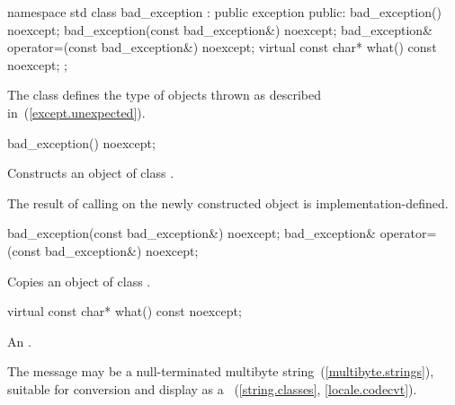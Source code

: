 %
\begin{codeblock}
namespace std {
  class bad_exception : public exception {
  public:
    bad_exception() noexcept;
    bad_exception(const bad_exception&) noexcept;
    bad_exception& operator=(const bad_exception&) noexcept;
    virtual const char* what() const noexcept;
  };
}
\end{codeblock}

\pnum
The class
defines the type of objects thrown as
described in~(\ref{except.unexpected}).

%
\begin{itemdecl}
bad_exception() noexcept;
\end{itemdecl}

\begin{itemdescr}
\pnum
\effects
Constructs an object of class
.

\pnum
\notes
The result of calling
on the newly constructed object is implementation-defined.%
\end{itemdescr}

%
%
\begin{itemdecl}
bad_exception(const bad_exception&) noexcept;
bad_exception& operator=(const bad_exception&) noexcept;
\end{itemdecl}

\begin{itemdescr}
\pnum
\effects
Copies an object of class
.
\end{itemdescr}

%
\begin{itemdecl}
virtual const char* what() const noexcept;
\end{itemdecl}

\begin{itemdescr}
\pnum
\returns
An  \ntbs.%

\pnum
\notes
The message may be a null-terminated multibyte string~(\ref{multibyte.strings}),
suitable for conversion and display as a
~(\ref{string.classes}, \ref{locale.codecvt}).
\end{itemdescr}

